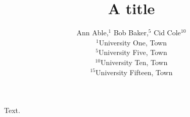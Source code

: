 \documentclass{mnras}
\title{A title}
\author[A. Able et al.]{Ann Able,$^{1}$ Bob Baker,$^{5}$ Cid Cole$^{10}$\\
$^{1}$University One, Town\\
$^{5}$University Five, Town\\
$^{10}$University Ten, Town\\
$^{15}$University Fifteen, Town}
\begin{document}
\maketitle
Text.
\end{document}
